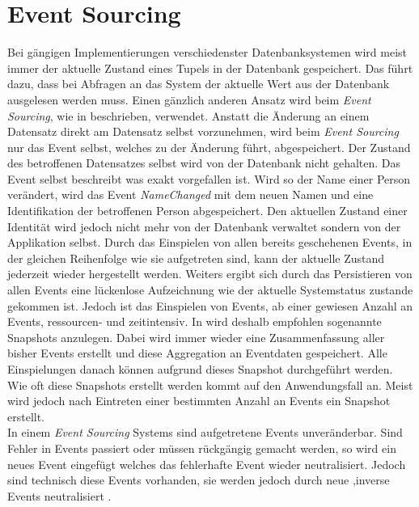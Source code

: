 \section{Event Sourcing}
Bei gängigen Implementierungen verschiedenster Datenbanksystemen wird meist immer der aktuelle Zustand eines Tupels in der Datenbank gespeichert. Das führt dazu, dass bei Abfragen an das System der aktuelle Wert aus der Datenbank ausgelesen werden muss. Einen gänzlich anderen Ansatz wird beim \textit{Event Sourcing}, wie in \cite{vernon2013implementing} beschrieben, verwendet. Anstatt die Änderung an einem Datensatz direkt am Datensatz selbst vorzunehmen, wird beim \textit{Event Sourcing} nur das Event selbst, welches zu der Änderung führt, abgespeichert. Der Zustand des betroffenen Datensatzes selbst wird von der Datenbank nicht gehalten. Das Event selbst beschreibt was exakt vorgefallen ist. Wird so der Name einer Person verändert, wird das Event \textit{NameChanged} mit dem neuen Namen und eine Identifikation der betroffenen Person abgespeichert. Den aktuellen Zustand einer Identität wird jedoch nicht mehr von der Datenbank verwaltet sondern von der Applikation selbst. Durch das Einspielen von allen bereits geschehenen Events, in der gleichen Reihenfolge wie sie aufgetreten sind, kann der aktuelle Zustand jederzeit wieder hergestellt werden. Weiters ergibt sich durch das Persistieren von allen Events eine lückenlose Aufzeichnung wie der aktuelle Systemstatus zustande gekommen ist. 
Jedoch ist das Einspielen von Events, ab einer gewiesen Anzahl an Events, ressourcen- und zeitintensiv. In \cite{vernon2013implementing} wird deshalb empfohlen sogenannte Snapshots  anzulegen. Dabei wird immer wieder eine Zusammenfassung aller bisher Events erstellt und diese Aggregation an Eventdaten gespeichert.  Alle Einspielungen danach können aufgrund dieses Snapshot durchgeführt werden. Wie oft diese Snapshots erstellt werden kommt auf den Anwendungsfall an. Meist wird jedoch nach Eintreten einer bestimmten Anzahl an Events ein Snapshot erstellt. \\
In einem  \textit{Event Sourcing} Systems sind aufgetretene Events unveränderbar. Sind Fehler in Events passiert oder müssen rückgängig gemacht werden, so wird ein neues Event eingefügt welches das fehlerhafte Event wieder neutralisiert. Jedoch sind technisch diese Events vorhanden, sie werden jedoch durch neue ,inverse Events  neutralisiert \citep{vernon2013implementing}. 
% 
% 
